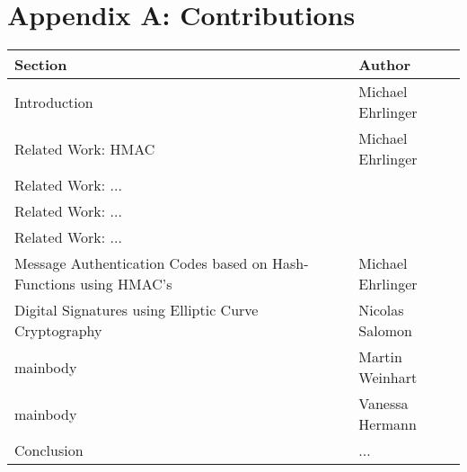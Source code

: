 \section{Appendix A: Contributions}

\begin{longtable}[ht]{|p{}|p{}|}
\hline
Section & Author \\ \hline \hline
Introduction & Michael Ehrlinger \\ \hline
Related Work: HMAC & Michael Ehrlinger \\ \hline
Related Work: ... & \\ \hline
Related Work: ... & \\ \hline
Related Work: ... & \\ \hline
Message Authentication Codes based on Hash-Functions using HMAC's & Michael Ehrlinger \\ \hline
Digital Signatures using Elliptic Curve Cryptography & Nicolas Salomon \\ \hline
mainbody & Martin Weinhart \\ \hline
mainbody & Vanessa Hermann \\ \hline
Conclusion & ... \\ \hline


\end{longtable}